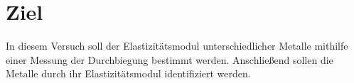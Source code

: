 \section{Ziel}

In diesem Versuch soll der Elastizitätsmodul unterschiedlicher Metalle mithilfe 
einer Messung der Durchbiegung bestimmt werden. Anschließend sollen die Metalle 
durch ihr Elastizitätsmodul identifiziert werden.

